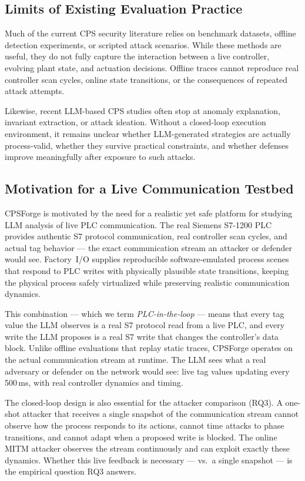 \subsection{Limits of Existing Evaluation Practice}

Much of the current CPS security literature relies on benchmark datasets, offline detection experiments, or scripted attack scenarios. While these methods are useful, they do not fully capture the interaction between a live controller, evolving plant state, and actuation decisions. Offline traces cannot reproduce real controller scan cycles, online state transitions, or the consequences of repeated attack attempts.

Likewise, recent LLM-based CPS studies often stop at anomaly explanation, invariant extraction, or attack ideation. Without a closed-loop execution environment, it remains unclear whether LLM-generated strategies are actually process-valid, whether they survive practical constraints, and whether defenses improve meaningfully after exposure to such attacks.

\subsection{Motivation for a Live Communication Testbed}

CPSForge is motivated by the need for a realistic yet safe platform for studying LLM analysis of live PLC communication. The real Siemens S7-1200 PLC provides authentic S7 protocol communication, real controller scan cycles, and actual tag behavior --- the exact communication stream an attacker or defender would see. Factory~I/O supplies reproducible software-emulated process scenes that respond to PLC writes with physically plausible state transitions, keeping the physical process safely virtualized while preserving realistic communication dynamics.

This combination --- which we term \emph{PLC-in-the-loop} --- means that every tag value the LLM observes is a real S7 protocol read from a live PLC, and every write the LLM proposes is a real S7 write that changes the controller's data block. Unlike offline evaluations that replay static traces, CPSForge operates on the actual communication stream at runtime. The LLM sees what a real adversary or defender on the network would see: live tag values updating every 500\,ms, with real controller dynamics and timing.

The closed-loop design is also essential for the attacker comparison (RQ3). A one-shot attacker that receives a single snapshot of the communication stream cannot observe how the process responds to its actions, cannot time attacks to phase transitions, and cannot adapt when a proposed write is blocked. The online MITM attacker observes the stream continuously and can exploit exactly these dynamics. Whether this live feedback is necessary --- vs.\ a single snapshot --- is the empirical question RQ3 answers.

